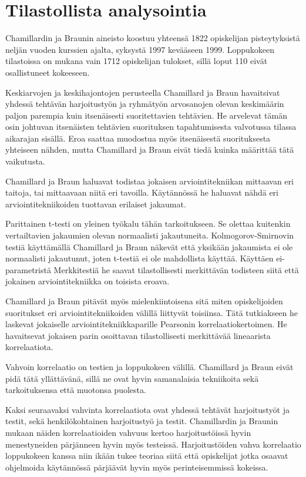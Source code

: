 \documentclass[finnish]{../tktltiki2}
\theoremstyle{definition}
\theoremstyle{remark}
\begin{document}
\section{Tilastollista analysointia}

Chamillardin ja Braunin aineisto koostuu yhteensä 1822 opiskelijan pisteytyksistä neljän vuoden kurssien ajalta, syksystä 1997 kevääseen 1999. Loppukokeen tilastoissa on mukana vain 1712 opiskelijan tulokset, sillä loput 110 eivät osallistuneet kokeeseen.

Keskiarvojen ja keskihajontojen perusteella Chamillard ja Braun havaitsivat yhdessä tehtävän harjoitustyön ja ryhmätyön arvosanojen olevan keskimäärin paljon parempia kuin itsenäisesti suoritettavien tehtävien. He arvelevat tämän osin johtuvan itsenäisten tehtävien suorituksen tapahtumisesta valvotussa tilassa aikarajan sisällä. Eroa saattaa muodostua myös itsenäisestä suorituksesta yhteiseen nähden, mutta Chamillard ja Braun eivät tiedä kuinka määrittää tätä vaikutusta.

Chamillard ja Braun haluavat todistaa jokaisen arviointitekniikan mittaavan eri taitoja, tai mittaavaan niitä eri tavoilla. Käytännössä he haluavat nähdä eri arviointitekniikoiden tuottavan erilaiset jakaumat.

Parittainen t-testi on yleinen työkalu tähän tarkoitukseen. Se olettaa kuitenkin vertailtavien jakaumien olevan normaalisti jakautuneita. Kolmogorov-Smirnovin testiä käyttämällä Chamillard ja Braun näkevät että yksikään jakaumista ei ole normaalisti jakautunut, joten t-testiä ei ole mahdollista käyttää. Käyttäen ei-parametristä Merkkitestiä he saavat tilastollisesti merkittävän todisteen siitä että jokainen arviointitekniikka on toisista eroava.

Chamillard ja Braun pitävät myös mielenkiintoisena sitä miten opiskelijoiden suoritukset eri arviointitekniikoiden välillä liittyvät toisiinsa. Tätä tutkiakseen he laskevat jokaiselle arviointitekniikkaparille Pearsonin korrelaatiokertoimen. He havaitsevat jokaisen parin osoittavan tilastollisesti merkittävää lineaarista korrelaatiota.

Vahvoin korrelaatio on testien ja loppukokeen välillä. Chamillard ja Braun eivät pidä tätä yllättävänä, sillä ne ovat hyvin samanalaisia tekniikoita sekä tarkoituksensa että muotonsa puolesta.

Kaksi seuraavaksi vahvinta korrelaatiota ovat yhdessä tehtävät harjoitustyöt ja testit, sekä henkilökohtainen harjoitustyö ja testit. Chamillardin ja Braunin mukaan näiden korrelaatioiden vahvuus kertoo harjoitustöissä hyvin menestyneiden pärjänneen hyvin myös testeissä. Harjoitustöiden vahva korrelaatio loppukokeen kanssa niin ikään tukee teoriaa siitä että opiskelijat jotka osaavat ohjelmoida käytännössä pärjäävät hyvin myös perinteisemmissä kokeissa.
\end{document}
